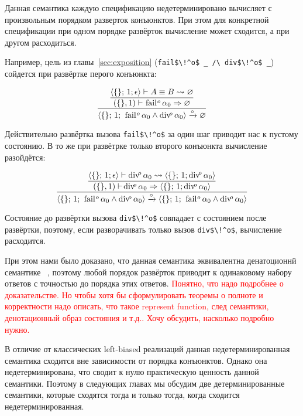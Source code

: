 Данная семантика каждую спецификацию недетерминировано вычисляет с произвольным порядком разверток конъюнктов. При этом для конкретной спецификации при одном порядке развёрток вычисление может сходится, а при другом расходиться. 

Например, цель из главы~\ref{sec:exposition} (\lstinline|fail$\!^o$ _ /\ div$\!^o$ _|) сойдется при развёртке перого конъюнкта:

\[
\dfrac
{\dfrac
{\inbr{\{\}; \, 1; \epsilon} \vdash A \equiv B \leadsto \emptyset}
{(\{\}, 1) \vdash\! \mbox{\lstinline|fail|}\!^o\, \alpha_0  \Rightarrow \emptyset}}
{\inbr{\{\}; \, 1; \, \mbox{\lstinline|fail|}\!^o\, \alpha_0 \land \mbox{\lstinline|div|}\!^o\, \alpha_0} \xrightarrow{\circ} \emptyset}
\]

\noindent Действительно развёртка вызова \lstinline|fail$\!^o$| за один шаг приводит нас к пустому состоянию. В то же при развётрке только второго конъюнкта вычисление разойдётся:

\[
\dfrac
{\dfrac
{\inbr{\{\}; \, 1; \epsilon} \vdash \mbox{\lstinline|div|}\!^o\, \alpha_0 \leadsto \inbr{\{\}; \, 1; \mbox{\lstinline|div|}\!^o\, \alpha_0}}
{(\{\}, 1) \vdash\! \mbox{\lstinline|div|}\!^o\, \alpha_0  \Rightarrow \inbr{\{\}; \, 1; \mbox{\lstinline|div|}\!^o\, \alpha_0}}}
{\inbr{\{\}; \, 1; \, \mbox{\lstinline|fail|}\!^o\, \alpha_0 \land \mbox{\lstinline|div|}\!^o\, \alpha_0} \xrightarrow{\circ} \inbr{\{\}; \, 1; \, \mbox{\lstinline|fail|}\!^o\, \alpha_0 \land \mbox{\lstinline|div|}\!^o\, \alpha_0}}
\]

\noindent Состояние до развёртки вызова \lstinline|div$\!^o$| совпадает с состоянием после развёртки, поэтому, если разворачивать только вызов \lstinline|div$\!^o$|, вычисление расходится.

При этом нами было доказано, что данная семантика эквивалентна денатоционнй семантике \mk~\cite{fair:semantics}, поэтому любой порядок развёрток приводит к одинаковому набору ответов с точностью до порядка этих ответов.
\textcolor{red}{Понятно, что надо подробнее о доказательстве. Но чтобы хотя бы сформулировать теоремы о полноте и корректности надо описать, что такое represent function, след семантики, денотационный образ состояния и т.д.. Хочу обсудить, насколько подробно нужно.}

В отличие от классических left-biased реализаций \mk данная недетерминированная семантика сходится вне зависимости от порядка конъюнктов. Однако она недетерминирована, что сводит к нулю практическую ценность данной семантики. Поэтому в следующих главах мы обсудим две детерминированные семантики, которые сходятся тогда и только тогда, когда сходится недетерминированная.